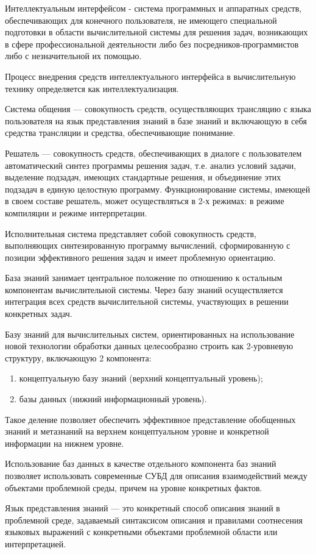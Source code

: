 \documentclass[a4paper,12pt]{report}
\begin{document}
	Интеллектуальным интерфейсом - система программных и аппаратных средств,
	обеспечивающих для конечного пользователя, не имеющего специальной подготовки
	в области вычислительной системы для решения задач, возникающих в сфере
	профессиональной деятельности либо без посредников-программистов либо с
	незначительной их помощью. \par
	Процесс внедрения средств интеллектуального интерфейса в вычислительную
	технику определяется как интеллектуализация. \par
	Система общения — совокупность средств, осуществляющих трансляцию с языка
	пользователя на язык представления знаний в базе знаний и включающую
	в себя средства трансляции и средства, обеспечивающие понимание. \par
	Решатель — совокупность средств, обеспечивающих в диалоге с пользователем
	автоматический синтез программы решения задач, т.е. анализ условий задачи,
	выделение подзадач, имеющих стандартные решения, и объединение этих подзадач
	в единую целостную программу. Функционирование системы, имеющей в своем
	составе решатель, может осуществляться в 2-х режимах: в режиме компиляции
	и режиме интерпретации. \par
	Исполнительная система представляет собой совокупность средств,
	выполняющих синтезированную программу вычислений, сформированную с позиции
	эффективного решения задач и имеет проблемную ориентацию. \par
	База знаний занимает центральное положение по отношению к остальным
	компонентам вычислительной системы. Через базу знаний осуществляется
	интеграция всех средств вычислительной системы, участвующих в решении
	конкретных задач. \par
	Базу знаний для вычислительных систем, ориентированных на использование
	новой технологии обработки данных целесообразно строить как 2-уровневую
	структуру, включающую 2 компонента:
	\begin{enumerate}
		\item концептуальную базу знаний (верхний концептуальный уровень);
		\item базы данных (нижний информационный уровень).
	\end{enumerate}

	Такое деление позволяет обеспечить эффективное представление обобщенных
	знаний и метазнаний на верхнем концептуальном уровне и конкретной информации
	на нижнем уровне. \par
	Использование баз данных в качестве отдельного компонента баз знаний
	позволяет использовать современные СУБД для описания взаимодействий между
	объектами проблемной среды, причем на уровне конкретных фактов. \par
	Язык представления знаний — это конкретный способ описания знаний в
	проблемной среде, задаваемый синтаксисом описания и правилами соотнесения
	языковых выражений с конкретными объектами проблемной области
	или интерпретацией.
\end{document}
